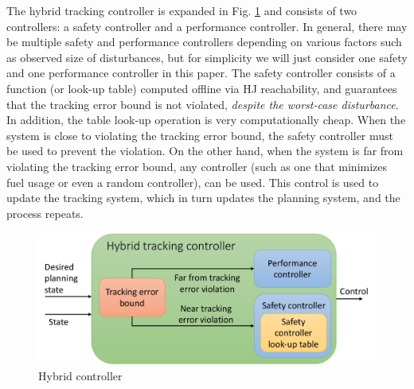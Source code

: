 The hybrid tracking controller is expanded in Fig. \ref{fig:hybrid_ctrl} and consists of two controllers: a safety controller and a performance controller. In general, there may be multiple safety and performance controllers depending on various factors such as observed size of disturbances, but for simplicity we will just consider one safety and one performance controller in this paper. The safety controller consists of a function (or look-up table) computed offline via HJ reachability, and guarantees that the tracking error bound is not violated, \textit{despite the worst-case disturbance}. In addition, the table look-up operation is very computationally cheap. When the system is close to violating the tracking error bound, the safety controller must be used to prevent the violation. On the other hand, when the system is far from violating the tracking error bound, any controller (such as one that minimizes fuel usage or even a random controller), can be used. This control is used to update the tracking system, which in turn updates the planning system, and the process repeats.
\begin{figure}[h!]
	\includegraphics[width=\columnwidth]{fig/hybrid_controller}
	\caption{Hybrid controller}
	\label{fig:hybrid_ctrl}
	\vspace{-.1in}
\end{figure}

